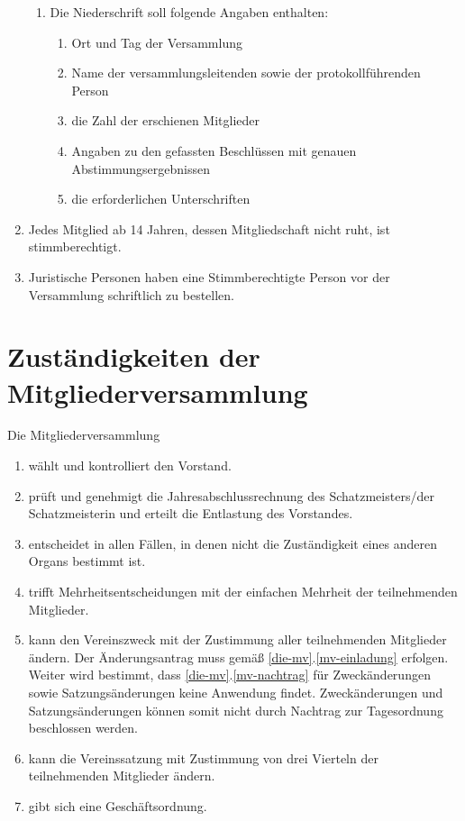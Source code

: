 \documentclass[a4paper, 12pt]{scrartcl}
\begin{document}
\begin{enumerate}
\begin{enumerate}
			\item Die Niederschrift soll folgende Angaben enthalten:
			\begin{enumerate}
	  		\item Ort und Tag der Versammlung
	    	\item Name der versammlungsleitenden sowie der protokollführenden Person
	    	\item die Zahl der erschienen Mitglieder
	    	\item Angaben zu den gefassten Beschlüssen mit genauen Abstimmungsergebnissen
	    	\item die erforderlichen Unterschriften
			\end{enumerate}
		\end{enumerate}
	\item \label{mv-ruhende-mitgliedschaft} Jedes Mitglied ab 14 Jahren, dessen Mitgliedschaft nicht ruht, ist stimmberechtigt.
	\item Juristische Personen haben eine Stimmberechtigte Person vor der Versammlung schriftlich zu bestellen.
\end{enumerate}

\section{Zuständigkeiten der Mitgliederversammlung}
Die Mitgliederversammlung
\begin{enumerate}
	\item wählt und kontrolliert den Vorstand.
	\item prüft und genehmigt die Jahresabschlussrechnung des Schatzmeisters/der Schatzmeisterin und erteilt die Entlastung des Vorstandes.
	\item entscheidet in allen Fällen, in denen nicht die Zuständigkeit eines anderen Organs bestimmt ist.
	\item trifft Mehrheitsentscheidungen mit der einfachen Mehrheit der teilnehmenden Mitglieder.
	\item kann den Vereinszweck mit der Zustimmung aller teilnehmenden
    Mitglieder ändern. Der Änderungsantrag muss gemäß
    \ref{die-mv}.\ref{mv-einladung} erfolgen. Weiter wird bestimmt, dass
    \ref{die-mv}.\ref{mv-nachtrag} für Zweckänderungen sowie
    Satzungsänderungen keine Anwendung findet. Zweckänderungen und
    Satzungsänderungen können somit nicht durch Nachtrag zur Tagesordnung beschlossen werden.
	\item kann die Vereinssatzung mit Zustimmung von drei Vierteln der teilnehmenden Mitglieder ändern. 
	\item gibt sich eine Geschäftsordnung.
\end{enumerate}
\end{document}
